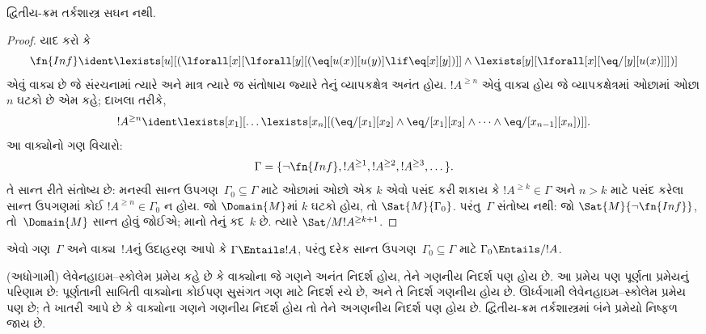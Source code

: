 \begin{thm}
દ્વિતીય-ક્રમ તર્કશાસ્ત્ર સઘન નથી.
\end{thm}

\begin{proof}
યાદ કરો કે
\[
\fn{Inf} \ident \lexists[u][(\lforall[x][\lforall[y][(\eq[u(x)][u(y)]
      \lif \eq[x][y])]] \land \lexists[y][\lforall[x][\eq/[y][u(x)]]])]
\]
એવું વાક્ય છે જે સંરચનામાં ત્યારે અને માત્ર ત્યારે જ
સંતોષાય જ્યારે તેનું વ્યાપકક્ષેત્ર અનંત હોય. $!A^{\ge n}$ એવું
વાક્ય હોય જે વ્યાપકક્ષેત્રમાં ઓછામાં ઓછા $n$ ઘટકો છે એમ કહે;
દાખલા તરીકે,
\[
!A^{\ge n} \ident \lexists[x_1][\dots\lexists[x_n][(\eq/[x_1][x_2]
    \land \eq/[x_1][x_3] \land \dots \land \eq/[x_{n-1}][x_n])]].
\]
આ વાક્યોનો ગણ વિચારો:
\[
\Gamma = \{\lnot \fn{Inf}, !A^{\ge 1}, !A^{\ge 2}, !A^{\ge 3}, \dots\}.
\]
તે સાન્ત રીતે સંતોષ્ય છે: મનસ્વી સાન્ત ઉપગણ~$\Gamma_0
\subseteq \Gamma$ માટે ઓછામાં ઓછો એક $k$ એવો પસંદ કરી શકાય કે
$!A^{\ge k} \in \Gamma$ અને $n>k$ માટે પસંદ કરેલા સાન્ત ઉપગણમાં
કોઈ $!A^{\ge n}
\in \Gamma_0$ ન હોય. જો $\Domain{M}$માં $k$ ઘટકો હોય,
તો $\Sat{M}{\Gamma_0}$. પરંતુ~$\Gamma$ સંતોષ્ય નથી: જો
$\Sat{M}{\lnot \fn{Inf}}$, તો~$\Domain{M}$ સાન્ત હોવું જોઈએ;
માનો તેનું કદ~$k$ છે. ત્યારે $\Sat/{M}{!A^{\ge k+1}}$.
\end{proof}

\begin{prob}
એવો ગણ~$\Gamma$ અને વાક્ય~$!A$નું ઉદાહરણ આપો કે
$\Gamma \Entails !A$, પરંતુ દરેક સાન્ત ઉપગણ~$\Gamma_0 \subseteq
\Gamma$ માટે $\Gamma_0 \Entails/ !A$.
\end{prob}
\endgroup


\begingroup
\makeatletter{}\makeatother


\label{guunit:OLP-0335}


\begin{explain}
(અધોગામી) લેવેનહાઇમ--સ્કોલેમ પ્રમેય કહે છે કે વાક્યોના જે
ગણને અનંત નિદર્શ હોય, તેને ગણનીય નિદર્શ પણ હોય છે. આ
પ્રમેય પણ પૂર્ણતા પ્રમેયનું પરિણામ છે: પૂર્ણતાની સાબિતી
વાક્યોના કોઈપણ સુસંગત ગણ માટે નિદર્શ રચે છે, અને તે નિદર્શ
ગણનીય હોય છે. ઊર્ધ્વગામી લેવેનહાઇમ--સ્કોલેમ પ્રમેય પણ છે;
તે ખાતરી આપે છે કે વાક્યોના ગણને ગણનીય નિદર્શ
હોય તો તેને અગણનીય નિદર્શ પણ હોય છે. દ્વિતીય-ક્રમ
તર્કશાસ્ત્રમાં બંને પ્રમેયો નિષ્ફળ જાય છે.
\end{explain}


